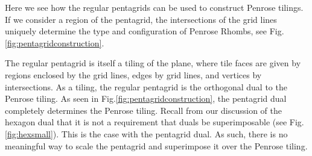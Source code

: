 \documentclass[
  oneside,
  11pt, a4paper,
  footinclude=true,
  headinclude=true,
  cleardoublepage=empty
]{scrbook}
\begin{document}
Here we see how the regular pentagrids can be used to construct Penrose tilings. If we consider a region of the pentagrid, the intersections of the grid lines uniquely determine the type and configuration of Penrose Rhombs, see Fig.\ref{fig:pentagridconstruction}. 

The regular pentagrid is itself a tiling of the plane, where tile faces are given by regions enclosed by the grid lines, edges by grid lines, and vertices by intersections. As a tiling, the regular pentagrid is the orthogonal dual to the Penrose tiling. As seen in Fig.\ref{fig:pentagridconstruction}, the pentagrid dual completely determines the Penrose tiling. Recall from our discussion of the hexagon dual that it is not a requirement that duals be superimposable (see Fig.\ref{fig:hexsmall}). This is the case with the pentagrid dual. As such, there is no meaningful way to scale the pentagrid and superimpose it over the Penrose tiling. 
\end{document}
